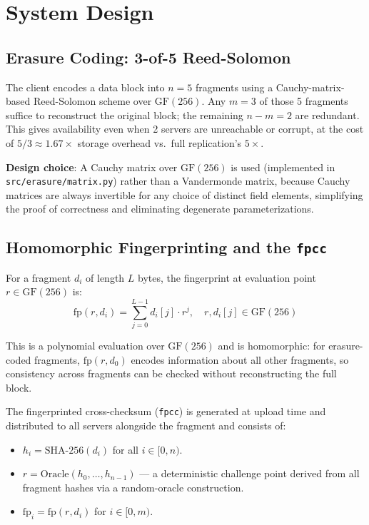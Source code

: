 \documentclass[10pt]{article}
\begin{document}
\section{System Design}

\subsection{Erasure Coding: 3-of-5 Reed-Solomon}

The client encodes a data block into $n = 5$ fragments using a Cauchy-matrix-based Reed-Solomon scheme over $\mathrm{GF}(256)$. Any $m = 3$ of those 5 fragments suffice to reconstruct the original block; the remaining $n - m = 2$ are redundant. This gives availability even when 2 servers are unreachable or corrupt, at the cost of $5/3 \approx 1.67\times$ storage overhead vs.\ full replication's $5\times$.

\textbf{Design choice}: A Cauchy matrix over $\mathrm{GF}(256)$ is used (implemented in \texttt{src/erasure/matrix.py}) rather than a Vandermonde matrix, because Cauchy matrices are always invertible for any choice of distinct field elements, simplifying the proof of correctness and eliminating degenerate parameterizations.

\subsection{Homomorphic Fingerprinting and the \texttt{fpcc}}

For a fragment $d_i$ of length $L$ bytes, the fingerprint at evaluation point $r \in \mathrm{GF}(256)$ is: $$ \mathrm{fp}(r, d_i) = \sum_{j=0}^{L-1} d_i[j] \cdot r^j, \quad r, d_i[j] \in \mathrm{GF}(256) $$

This is a polynomial evaluation over $\mathrm{GF}(256)$ and is homomorphic: for erasure-coded fragments, $\mathrm{fp}(r, d_0)$ encodes information about all other fragments, so consistency across fragments can be checked without reconstructing the full block.

The fingerprinted cross-checksum (\texttt{fpcc}) is generated at upload time and distributed to all servers alongside the fragment and consists of:
\begin{itemize}
  \item $h_i = \mathrm{SHA\text{-}256}(d_i)$ for all $i \in [0, n)$.
  \item $r = \mathrm{Oracle}(h_0, \ldots, h_{n-1})$ — a deterministic challenge point
        derived from all fragment hashes via a random-oracle construction.
  \item $\mathrm{fp}_i = \mathrm{fp}(r, d_i)$ for $i \in [0, m)$.
\end{itemize}
\end{document}

